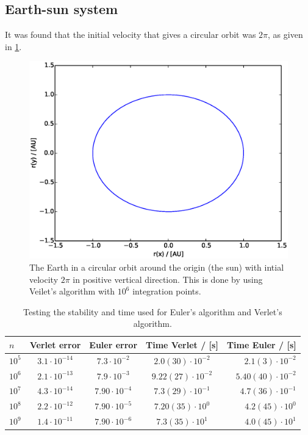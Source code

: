 \documentclass{article}
\begin{document}
\subsection{Earth-sun system}
It was found that the initial velocity that gives a circular orbit was $2\pi$, as given in \ref{jordensbane}.
\begin{figure}[H]
  \includegraphics[scale=0.6]{plots/3c_jordensbane_verlet_n10e6.eps}
  \caption{The Earth in a circular orbit around the origin (the sun) with intial velocity $2\pi$ in positive vertical direction. This is done by using Veilet's algorithm with $10^6$ integration points.}
  \label{jordensbane}
\end{figure}

\begin{table}[H]
    \centering
    \begin{tabular}{|l|c|c|c|r|}
    \hline
     $n$ & Verlet error  & Euler error & Time Verlet / [s] & Time Euler / [s]\\
     \hline
      $10^5$  & $3.1\cdot10^{-14}$  & $7.3\cdot10^{-2}$ & $ 2.0 (30) \cdot 10^{-2}$ & $ 2.1 (3) \cdot 10^{-2}$\\
      $10^6$  & $2.1\cdot10^{-13}$  & $7.9\cdot10^{-3}$ & $ 9.22 (27) \cdot 10^{-2}$ & $ 5.40 (40)\cdot 10^{-2}$\\
      $10^7$  & $4.3\cdot10^{-14}$  & $7.90\cdot10^{-4}$ & $ 7.3 (29) \cdot 10^{-1}$ & $ 4.7 (36) \cdot 10^{-1}$\\
      $10^8$  & $2.2\cdot10^{-12}$  & $7.90\cdot10^{-5}$ & $ 7.20 (35) \cdot 10^{0}$ & $ 4.2 (45) \cdot 10^{0}$\\
      $10^9$  & $1.4\cdot10^{-11}$  & $7.90\cdot10^{-6}$ & $ 7.3 (35) \cdot 10^{1}$ & $ 4.0 (45) \cdot 10^{1}$\\
      \hline
    \end{tabular}
    \caption{Testing the stability and time used for Euler's algorithm and Verlet's algorithm.}
    \label{stability}
\end{table}
\end{document}
